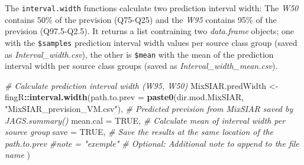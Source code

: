 \documentclass[
]{article}
\newenvironment{Shaded}{\begin{snugshade}}{\end{snugshade}}
\newcommand{\AttributeTok}[1]{\textcolor[rgb]{0.13,0.29,0.53}{#1}}
\newcommand{\CommentTok}[1]{\textcolor[rgb]{0.56,0.35,0.01}{\textit{#1}}}
\newcommand{\ConstantTok}[1]{\textcolor[rgb]{0.56,0.35,0.01}{#1}}
\newcommand{\FunctionTok}[1]{\textcolor[rgb]{0.13,0.29,0.53}{\textbf{#1}}}
\newcommand{\NormalTok}[1]{#1}
\newcommand{\OtherTok}[1]{\textcolor[rgb]{0.56,0.35,0.01}{#1}}
\newcommand{\SpecialCharTok}[1]{\textcolor[rgb]{0.81,0.36,0.00}{\textbf{#1}}}
\newcommand{\StringTok}[1]{\textcolor[rgb]{0.31,0.60,0.02}{#1}}
\begin{document}
The \texttt{interval.width} functions calculate two prediction interval
width: The \emph{W50} contains 50\% of the prevision (Q75-Q25) and the
\emph{W95} contains 95\% of the prevision (Q97.5-Q2.5). It returns a
list contraining two \emph{data.frame} objects; one with the
\texttt{\$samples} prediction interval width values per source class
group (saved as \emph{Interval\_width.csv}), the other is
\texttt{\$mean} with the mean of the prediction interval width per
source class groups (saved as \emph{Interval\_width\_mean.csv}).

\begin{Shaded}
\begin{Highlighting}[]
\CommentTok{\# Calculate prediction interval width (W95, W50)}
\NormalTok{MixSIAR.predWidth }\OtherTok{\textless{}{-}}\NormalTok{ fingR}\SpecialCharTok{::}\FunctionTok{interval.width}\NormalTok{(}\AttributeTok{path.to.prev =} \FunctionTok{paste0}\NormalTok{(dir.mod.MixSIAR, }\StringTok{"MixSIAR\_prevision\_VM.csv"}\NormalTok{), }\CommentTok{\# Predicted prevision from MixSIAR saved by \textasciigrave{}JAGS.summary()\textasciigrave{}}
                                           \AttributeTok{mean.cal =} \ConstantTok{TRUE}\NormalTok{,                                                    }\CommentTok{\# Calculate mean of interval width per source group}
                                           \AttributeTok{save =} \ConstantTok{TRUE}\NormalTok{,                                                        }\CommentTok{\# Save the results at the same location of the path.to.prev}
                                           \CommentTok{\#note = "exemple"                                                   \# Optional: Additional note to append to the file name}
\NormalTok{                                           )}
\end{Highlighting}
\end{Shaded}
\end{document}
